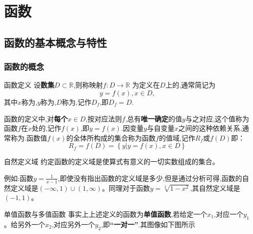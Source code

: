 \documentclass[12pt, a4paper, oneside, UTF8]{ctexbook}  %
\begin{document}
\begin{sloppypar}
    \else
    \fi
    \chapter{函数}
    \section{函数的基本概念与特性}
    \subsection{函数的概念}
    \begin{defn}{函数定义}{}
        设\textbf{数集}$D \subset \mathbb{R}$,则称映射$f:D \to \mathbb{R}$ 为定义在$D$上的,通常简记为
        $$
            y=f(x),x \in D,
        $$
        其中$x$称为,$y$称为,$D$称为,记作$D_f$,即$D_f=D$.
    \end{defn}
    函数的定义中,对\textbf{每个}$x \in D$,按对应法则$f$,总有\textbf{唯一确定}的值$y$与之对应,这个值称为函数$f$在$x$处的,记作$f(x)$,即$y=f(x)$.因变量$y$与自变量$x$之间的这种依赖关系,通常称为.函数值$f(x)$的全体所构成的集合称为函数$f$的值域,记作$R_f$或$f(D)$即：
    $$
        R_{f}=f(D)=\left\{y|y=f(x),x\in D\right\}
    $$
    \begin{defn}{自然定义域}{}
        约定函数的定义域是使算式有意义的一切实数组成的集合。
    \end{defn}
    例如:函数$y=\frac{1}{x-1}$,即使没有指出函数的定义域是多少,但是通过分析可得,函数的自然定义域是$(-\infty,1)\cup(1,\infty)$。同理对于函数$y=\sqrt[2]{1-x^2}$,其自然定义域是$(-1,1)$。
    \begin{criterion}{单值函数与多值函数}{}
        事实上上述定义的函数为\textbf{单值函数},若给定一个$x_1$,对应一个$y_1$。给另外一个$x_2$,对应另外一个$y_2$,即\textbf{“一对一”}.其图像如下图所示\\
        \begin{center}
\end{center}
\end{criterion}
\end{sloppypar}
\end{document}
